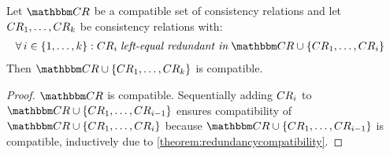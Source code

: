     

\begin{corollary} \label{corollary:transitiveredundancycompatibility}
    Let $\consistencyrelationset{CR}$ be a compatible set of consistency relations and let $\consistencyrelation{CR}{1}, \dots, \consistencyrelation{CR}{k}$ be consistency relations with:
    \begin{align*}
        &
        \forall i \in \setted{1, \dots, k} : %
        \consistencyrelation{CR}{i} \leftequalredundantinmath \consistencyrelationset{CR} \cup \setted{\consistencyrelation{CR}{1}, \dots, \consistencyrelation{CR}{i}}
    \end{align*}
    Then $\consistencyrelationset{CR} \cup \setted{\consistencyrelation{CR}{1}, \dots, \consistencyrelation{CR}{k}}$ is compatible.
\end{corollary}

\begin{proof}
    $\consistencyrelationset{CR}$ is compatible. Sequentially adding $\consistencyrelation{CR}{i}$ to $\consistencyrelationset{CR} \cup \setted{\consistencyrelation{CR}{1}, \dots, \consistencyrelation{CR}{i-1}}$ ensures compatibility of $\consistencyrelationset{CR} \cup \setted{\consistencyrelation{CR}{1}, \dots, \consistencyrelation{CR}{i}}$ because $\consistencyrelationset{CR} \cup \setted{\consistencyrelation{CR}{1}, \dots, \consistencyrelation{CR}{i-1}}$ is compatible, inductively due to \autoref{theorem:redundancycompatibility}.
\end{proof}

